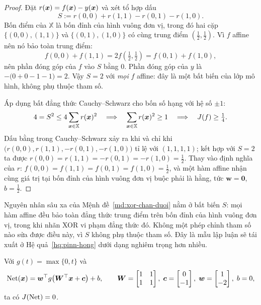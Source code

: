 \begin{proof}
Đặt $r(\bm{x}) = f(\bm{x}) - y(\bm{x})$ và xét tổ hợp dấu
\[
S := r(0,0) + r(1,1) - r(0,1) - r(1,0).
\]
Bốn điểm của $\mathbb{X}$ là bốn đỉnh của hình vuông đơn vị, trong đó hai cặp
$\{(0,0),(1,1)\}$ và $\{(0,1),(1,0)\}$ có cùng trung điểm
$(\tfrac12,\tfrac12)$. Vì $f$ affine nên nó bảo toàn trung điểm:
\[
f(0,0)+f(1,1) = 2f\!\left(\tfrac12,\tfrac12\right) = f(0,1)+f(1,0),
\]
nên phần đóng góp của $f$ vào $S$ bằng $0$. Phần đóng góp của $y$ là
$-\big(0 + 0 - 1 - 1\big) = 2$. Vậy $S = 2$ với \emph{mọi} $f$ affine: đây là
một bất biến của lớp mô hình, không phụ thuộc tham số.
 
Áp dụng bất đẳng thức Cauchy--Schwarz cho bốn số hạng với hệ số $\pm 1$:
\[
4 = S^2 \le 4 \sum_{\bm{x}\in\mathbb{X}} r(\bm{x})^2
\quad\Longrightarrow\quad
\sum_{\bm{x}\in\mathbb{X}} r(\bm{x})^2 \ge 1
\quad\Longrightarrow\quad
J(f) \ge \tfrac14 .
\]
Dấu bằng trong Cauchy--Schwarz xảy ra khi và chỉ khi
$\big(r(0,0), r(1,1), -r(0,1), -r(1,0)\big)$ tỉ lệ với $(1,1,1,1)$; kết hợp với
$S = 2$ ta được $r(0,0) = r(1,1) = -r(0,1) = -r(1,0) = \tfrac12$. Thay vào định
nghĩa của $r$: $f(0,0) = f(1,1) = f(0,1) = f(1,0) = \tfrac12$, và một hàm affine
nhận cùng giá trị tại bốn đỉnh của hình vuông đơn vị buộc phải là hằng, tức
$\bm{w} = \bm{0}$, $b = \tfrac12$.
\end{proof}
 
Nguyên nhân sâu xa của Mệnh đề~\ref{md:xor-chan-duoi} nằm ở bất biến $S$: mọi
hàm affine đều bảo toàn đẳng thức trung điểm trên bốn đỉnh của hình vuông đơn
vị, trong khi nhãn XOR vi phạm đẳng thức đó. Không một phép chỉnh tham số nào
sửa được điều này, vì $S$ không phụ thuộc tham số. Đây là mẫu lập luận sẽ tái
xuất ở Hệ quả~\ref{hq:pinn-hong} dưới dạng nghiêm trọng hơn nhiều.
 
\begin{menhde}
\label{md:xor-nghiem}
Với $g(t) = \max\{0,t\}$ và
\begin{equation}
\operatorname{Net}(\bm{x}) = \bm{w}^{\top} g\!\left( \bm{W}^{\top}\bm{x} + \bm{c} \right) + b,
\qquad
\bm{W} = \begin{bmatrix} 1 & 1 \\ 1 & 1 \end{bmatrix}, \;
\bm{c} = \begin{bmatrix} 0 \\ -1 \end{bmatrix}, \;
\bm{w} = \begin{bmatrix} 1 \\ -2 \end{bmatrix}, \; b = 0,
\label{eq:xor-net}
\end{equation}
ta có $J(\operatorname{Net}) = 0$.
\end{menhde}
 
